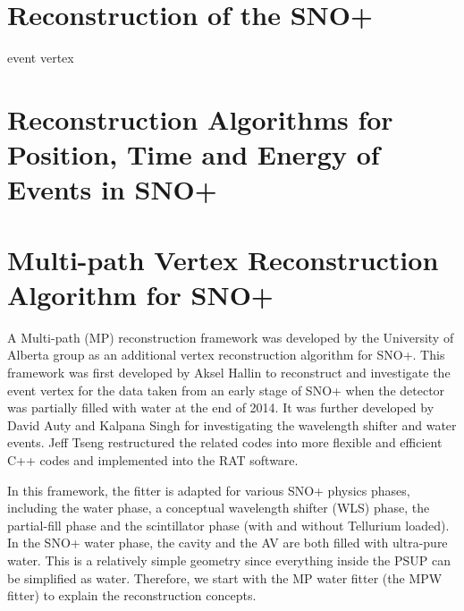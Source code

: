 \section{Reconstruction of the SNO+}

event vertex


\section{Reconstruction Algorithms for Position, Time and Energy of Events in SNO+}






\section{Multi-path Vertex Reconstruction Algorithm for SNO+}
A Multi-path (MP) reconstruction framework was developed by the University of Alberta group as an additional vertex reconstruction algorithm for SNO+.
This framework was first developed by Aksel Hallin to reconstruct and investigate the event vertex for the data taken from an early stage of SNO+ when the detector was partially filled with water at the end of 2014\cite{partialWater}. It was further developed by David Auty and Kalpana Singh for investigating the wavelength shifter and water events\cite{davidPartialWater, kalpanaWLS, kalpanaWLS2, kalpanaMPFitter}. Jeff Tseng restructured the related codes into more flexible and efficient C++ codes and implemented into the RAT software\cite{jieMPW}.

In this framework, the fitter is adapted for various SNO+ physics phases, including the water phase, a conceptual wavelength shifter (WLS) phase, the partial-fill phase and the scintillator phase (with and without Tellurium loaded). In the SNO+ water phase, the cavity and the AV are both filled with ultra-pure water. This is a relatively simple geometry since everything inside the PSUP can be simplified as water. Therefore, we start with the MP water fitter (the MPW fitter) to explain the reconstruction concepts.

